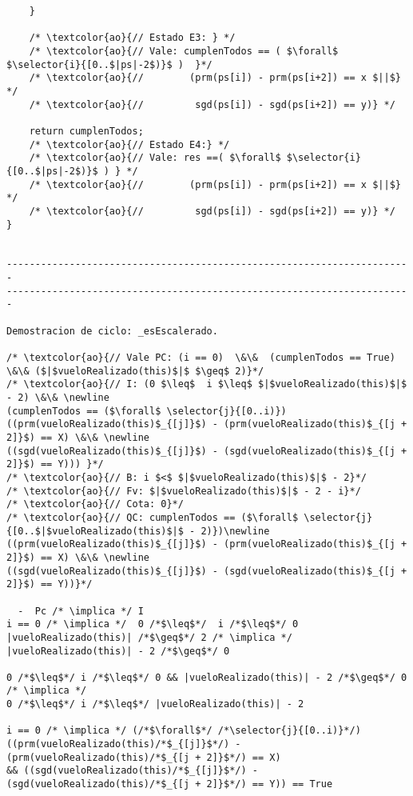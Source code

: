 \begin{lstlisting}
    }
    
    /* \textcolor{ao}{// Estado E3: } */
    /* \textcolor{ao}{// Vale: cumplenTodos == ( $\forall$ $\selector{i}{[0..$|ps|-2$)}$ )  }*/
    /* \textcolor{ao}{//        (prm(ps[i]) - prm(ps[i+2]) == x $||$} */
    /* \textcolor{ao}{//         sgd(ps[i]) - sgd(ps[i+2]) == y)} */
 
    return cumplenTodos;
    /* \textcolor{ao}{// Estado E4:} */
    /* \textcolor{ao}{// Vale: res ==( $\forall$ $\selector{i}{[0..$|ps|-2$)}$ ) } */    
    /* \textcolor{ao}{//        (prm(ps[i]) - prm(ps[i+2]) == x $||$} */
    /* \textcolor{ao}{//         sgd(ps[i]) - sgd(ps[i+2]) == y)} */
}


-----------------------------------------------------------------------
-----------------------------------------------------------------------

Demostracion de ciclo: _esEscalerado.

/* \textcolor{ao}{// Vale PC: (i == 0)  \&\&  (cumplenTodos == True) \&\& ($|$vueloRealizado(this)$|$ $\geq$ 2)}*/
/* \textcolor{ao}{// I: (0 $\leq$  i $\leq$ $|$vueloRealizado(this)$|$ - 2) \&\& \newline
(cumplenTodos == ($\forall$ \selector{j}{[0..i)}) ((prm(vueloRealizado(this)$_{[j]}$) - (prm(vueloRealizado(this)$_{[j + 2]}$) == X) \&\& \newline
((sgd(vueloRealizado(this)$_{[j]}$) - (sgd(vueloRealizado(this)$_{[j + 2]}$) == Y))) }*/
/* \textcolor{ao}{// B: i $<$ $|$vueloRealizado(this)$|$ - 2}*/
/* \textcolor{ao}{// Fv: $|$vueloRealizado(this)$|$ - 2 - i}*/
/* \textcolor{ao}{// Cota: 0}*/
/* \textcolor{ao}{// QC: cumplenTodos == ($\forall$ \selector{j}{[0..$|$vueloRealizado(this)$|$ - 2)})\newline
((prm(vueloRealizado(this)$_{[j]}$) - (prm(vueloRealizado(this)$_{[j + 2]}$) == X) \&\& \newline
((sgd(vueloRealizado(this)$_{[j]}$) - (sgd(vueloRealizado(this)$_{[j + 2]}$) == Y))}*/    

  -  Pc /* \implica */ I
i == 0 /* \implica */  0 /*$\leq$*/  i /*$\leq$*/ 0
|vueloRealizado(this)| /*$\geq$*/ 2 /* \implica */ |vueloRealizado(this)| - 2 /*$\geq$*/ 0

0 /*$\leq$*/ i /*$\leq$*/ 0 && |vueloRealizado(this)| - 2 /*$\geq$*/ 0 /* \implica */
0 /*$\leq$*/ i /*$\leq$*/ |vueloRealizado(this)| - 2 

i == 0 /* \implica */ (/*$\forall$*/ /*\selector{j}{[0..i)}*/) ((prm(vueloRealizado(this)/*$_{[j]}$*/) - (prm(vueloRealizado(this)/*$_{[j + 2]}$*/) == X) 
&& ((sgd(vueloRealizado(this)/*$_{[j]}$*/) - (sgd(vueloRealizado(this)/*$_{[j + 2]}$*/) == Y)) == True


\end{lstlisting}
